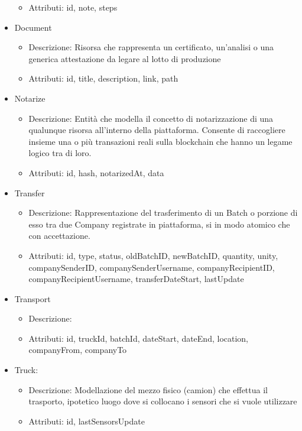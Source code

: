 \documentclass[a4paper,11pt]{article}
\begin{document}
\begin{itemize}
\begin{itemize}
          \item Attributi: id, note, steps
        \end{itemize}
  \item Document
        \begin{itemize}
          \item Descrizione: Risorsa che rappresenta un certificato, un'analisi o una generica attestazione da legare al lotto di produzione
          \item Attributi: id, title, description, link, path
        \end{itemize}
  \item Notarize
        \begin{itemize}
          \item Descrizione: Entità che modella il concetto di notarizzazione di una qualunque risorsa all'interno della piattaforma. Consente di raccogliere insieme una o più transazioni reali sulla blockchain che hanno un legame logico tra di loro.
          \item Attributi: id, hash, notarizedAt, data
        \end{itemize}
  \item Transfer
        \begin{itemize}
          \item Descrizione: Rappresentazione del trasferimento di un Batch o porzione di esso tra due Company registrate in piattaforma, si in modo atomico che con accettazione.
          \item Attributi: id, type, status, oldBatchID, newBatchID, quantity, unity, companySenderID, companySenderUsername, companyRecipientID, companyRecipientUsername, transferDateStart, lastUpdate
        \end{itemize}
  \item Transport
        \begin{itemize}
          \item Descrizione:
          \item Attributi: id, truckId, batchId, dateStart, dateEnd, location, companyFrom, companyTo
        \end{itemize}
  \item Truck:
        \begin{itemize}
          \item Descrizione: Modellazione del mezzo fisico (camion) che effettua il trasporto, ipotetico luogo dove si collocano i sensori che si vuole utilizzare
          \item Attributi: id, lastSensorsUpdate

\end{itemize}
\end{itemize}
\end{document}
